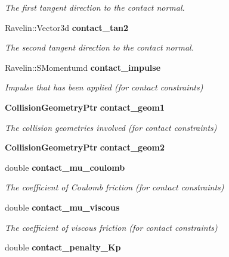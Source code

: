 \begin{DoxyCompactItemize}
\begin{DoxyCompactList}\small\item\em The first tangent direction to the contact normal. \end{DoxyCompactList}\item 
Ravelin\-::\-Vector3d {\bf contact\-\_\-tan2}\label{classMoby_1_1UnilateralConstraint_a786e186c5d530bea46bc46a586cfd0a4}

\begin{DoxyCompactList}\small\item\em The second tangent direction to the contact normal. \end{DoxyCompactList}\item 
Ravelin\-::\-S\-Momentumd {\bf contact\-\_\-impulse}
\begin{DoxyCompactList}\small\item\em Impulse that has been applied (for contact constraints) \end{DoxyCompactList}\item 
{\bf Collision\-Geometry\-Ptr} {\bf contact\-\_\-geom1}\label{classMoby_1_1UnilateralConstraint_a7632321f98cecb32d75eecdd7b48f551}

\begin{DoxyCompactList}\small\item\em The collision geometries involved (for contact constraints) \end{DoxyCompactList}\item 
{\bf Collision\-Geometry\-Ptr} {\bfseries contact\-\_\-geom2}\label{classMoby_1_1UnilateralConstraint_a99dacf39b1fe9e05447f2b6722995287}

\item 
double {\bf contact\-\_\-mu\-\_\-coulomb}\label{classMoby_1_1UnilateralConstraint_a6c466e433bb619cb5cc8301753044a14}

\begin{DoxyCompactList}\small\item\em The coefficient of Coulomb friction (for contact constraints) \end{DoxyCompactList}\item 
double {\bf contact\-\_\-mu\-\_\-viscous}\label{classMoby_1_1UnilateralConstraint_ac4dba653546baccb01875d10f98d1f90}

\begin{DoxyCompactList}\small\item\em The coefficient of viscous friction (for contact constraints) \end{DoxyCompactList}\item 
double {\bf contact\-\_\-penalty\-\_\-\-Kp}\label{classMoby_1_1UnilateralConstraint_aec8bd9578b9cb06d2db25077dc3ba386}


\end{DoxyCompactItemize}
